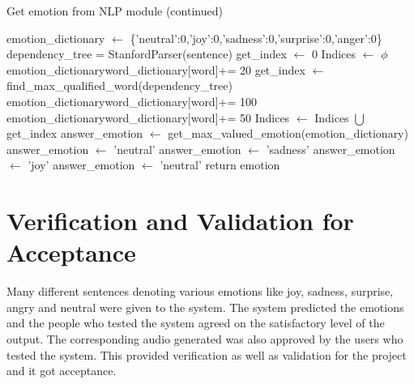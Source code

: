 \documentclass[oneside,a4paper,12pt]{book}
\begin{document}
	\begin{algorithm}
		\ContinuedFloat
		\caption{Get emotion from NLP module (continued)}
		\begin{algorithmic}
			
			\State emotion\_dictionary $\leftarrow$ \{'neutral':0,'joy':0,'sadness':0,'surprise':0,'anger':0\}
			\State dependency\_tree = StanfordParser(sentence)
			\State get\_index $\leftarrow$ 0
			\State Indices $\leftarrow$ $\phi$
			\State emotion\_dictionary\lbrack word\_dictionary[word]\rbrack += 20
			\State get\_index $\leftarrow$ find\_max\_qualified\_word(dependency\_tree)
			\State emotion\_dictionary\lbrack word\_dictionary[word]\rbrack += 100
			\State emotion\_dictionary\lbrack word\_dictionary[word]\rbrack += 50
			\EndIf
			\EndIf
			\EndIf
			\EndFor
			\State Indices $\leftarrow$ Indices $\bigcup$ get\_index
			\EndFor
			\State answer\_emotion $\leftarrow$ get\_max\_valued\_emotion(emotion\_dictionary)
			\State answer\_emotion $\leftarrow$ 'neutral'
			\State answer\_emotion $\leftarrow$ 'sadness'
			\State answer\_emotion $\leftarrow$ 'joy'
			\Else
			\State answer\_emotion $\leftarrow$ 'neutral'
			\EndIf
			\EndIf
			\EndIf
			\EndIf
			\State return emotion
			\EndProcedure
		\end{algorithmic}
	\end{algorithm}

  

  \section{Verification and Validation for Acceptance}
  Many different sentences denoting various emotions like joy, sadness, surprise, angry and neutral were given to the system. The system predicted the emotions and the people who tested the system agreed on the satisfactory level of the output. The corresponding audio generated was also approved by the users who tested the system. This provided verification as well as validation for the project and it got acceptance.
  
\end{document}

